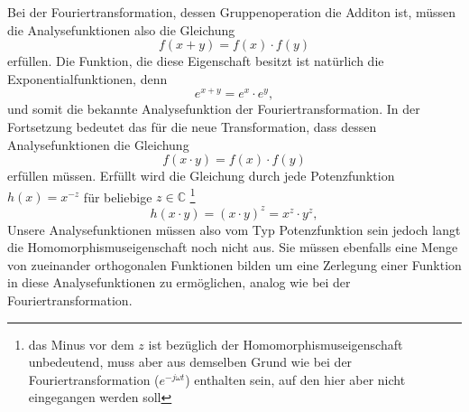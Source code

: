 Bei der Fouriertransformation, dessen Gruppenoperation die Additon ist, müssen die Analysefunktionen also die Gleichung 
\begin{equation}
    f(x + y) = f(x) \cdot f(y)
    \label{mellin:hom1}
\end{equation}
erfüllen. 
Die Funktion, die diese Eigenschaft besitzt ist natürlich die Exponentialfunktionen, denn 
\begin{equation}
    e^{x + y} = e^x \cdot e^y,
    \label{mellin:exp}
\end{equation}
und somit die bekannte Analysefunktion der Fouriertransformation.
In der Fortsetzung bedeutet das für die neue Transformation, dass dessen Analysefunktionen die Gleichung
\begin{equation}
    f(x \cdot y) = f(x) \cdot f(y)
    \label{mellin:hom2}
\end{equation}
erfüllen müssen.
Erfüllt wird die Gleichung durch jede Potenzfunktion $h(x) = x^{-z}$ für beliebige $z \in \mathbb{C}$
\footnote{das Minus vor dem $z$ ist bezüglich der Homomorphismuseigenschaft unbedeutend, muss aber aus demselben Grund wie 
bei der Fouriertransformation ($e^{-j\omega t}$) enthalten sein, auf den hier aber nicht eingegangen werden soll}
\begin{equation}
    h(x \cdot y) =  (x \cdot y)^{z} = x^{z} \cdot y^{z},
\end{equation}
Unsere Analysefunktionen müssen also vom Typ Potenzfunktion sein jedoch langt die Homomorphismuseigenschaft noch nicht aus. 
Sie müssen ebenfalls eine Menge von zueinander orthogonalen Funktionen bilden um eine Zerlegung einer Funktion in diese 
Analysefunktionen zu ermöglichen, analog wie bei der Fouriertransformation. 
